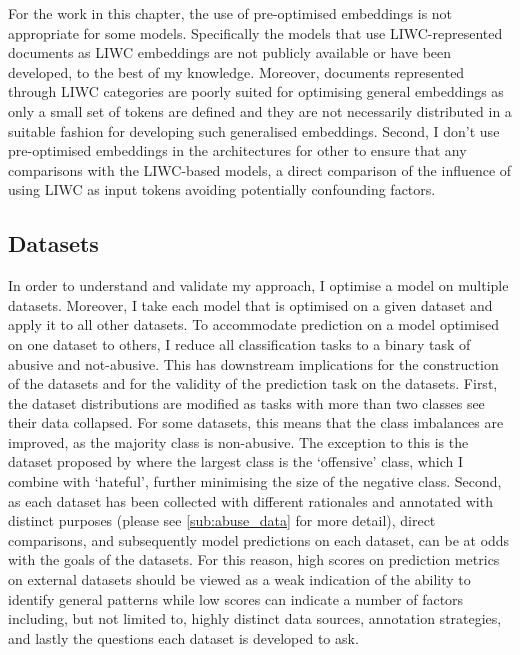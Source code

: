 For the work in this chapter, the use of pre-optimised embeddings is not appropriate for some models.
Specifically the models that use LIWC-represented documents as LIWC embeddings are not publicly available or have been developed, to the best of my knowledge.
Moreover, documents represented through LIWC categories are poorly suited for optimising general embeddings as only a small set of tokens are defined and they are not necessarily distributed in a suitable fashion for developing such generalised  embeddings.
Second, I don't use pre-optimised embeddings in the architectures for other  to ensure that any comparisons with the LIWC-based models,  a direct comparison of the influence of using LIWC as input tokens avoiding potentially confounding factors.

\subsection{Datasets}\label{sub:LIWC_datasets}
In order to understand and validate my approach, I optimise a model on multiple datasets.
Moreover, I take each model that is optimised on a given dataset and apply it to all other datasets.
To accommodate prediction on a model optimised on one dataset to others, I reduce all classification tasks to a binary task of abusive and not-abusive.
This has downstream implications for the construction of the datasets and for the validity of the prediction task on the  datasets.
First, the dataset distributions are modified as tasks with more than two classes see their data collapsed.
For some datasets, this means that the class imbalances are improved, as the majority class is non-abusive.
The exception to this is the dataset proposed by \citet{Davidson:2017} where the largest class is the `offensive' class, which I combine with `hateful', further minimising the  size of the negative class.
Second, as each dataset has been collected with different rationales and annotated with distinct purposes (please see \cref{sub:abuse_data} for more detail), direct comparisons, and subsequently model predictions on each dataset, can be at odds with the goals of the datasets.
For this reason, high scores on prediction metrics on external datasets should be viewed as a weak indication of the ability to identify general patterns while low scores can indicate a number of factors including, but not limited to, highly distinct data sources, annotation strategies, and lastly the questions each dataset is developed to ask.

